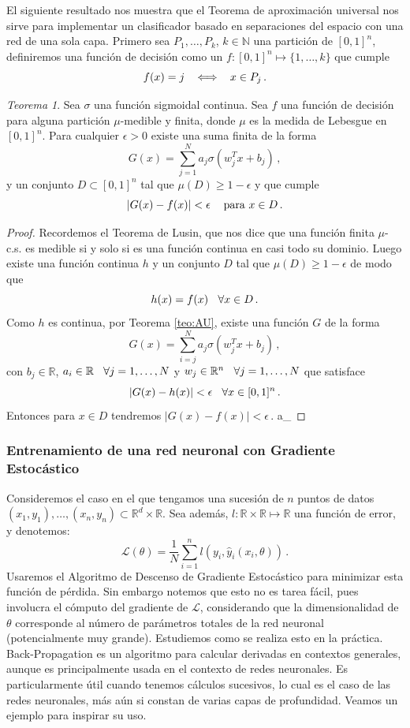 \documentclass[letterpaper,11pt]{article} %
\def\espacio{\hspace{.25cm}\,}
\theoremstyle{defbreak}
\theoremstyle{propbreak}
\theoremstyle{remark}
\theoremstyle{break}
\newtheorem{theorem}{Teorema}[subsection]
\def\ssi{\Longleftrightarrow}
\def\R{\mathbb{R}}
\def\N{\mathbb{N}}
\def\gris{\color{mygray}}
\def\negro{\color{black}}
\def\findem{\null\hfill\color{white}a\color{black}_\square}
\begin{document}
El siguiente resultado nos muestra que el Teorema de aproximación universal nos sirve para implementar un clasificador basado en separaciones del espacio con una red de una sola capa. Primero sea $P_1,\dots,P_k$, $k\in\N$ una partición de $[0,1]^n$, definiremos una función de decisión como un $f:[0,1]^n\mapsto \{1,\dots,k\}$ que cumple
$$ f(x) = j \espacio \ssi \espacio x\in P_j \,.$$
\begin{theorem}
Sea $\sigma$ una función sigmoidal continua. Sea $f$ una función de decisión para alguna partición $\mu$-medible y finita, donde $\mu$ es la medida de Lebesgue en $[0,1]^n$. Para cualquier $\epsilon>0$ existe una suma finita de la forma
$$ G(x) = \displaystyle \sum^N_{j=1}a_j\sigma(w^T_jx+b_j) \,,$$
y un conjunto $D\subset [0,1]^n$ tal que $\mu(D)\geq 1-\epsilon$ y que cumple
$$ |G(x)-f(x)|<\epsilon\espacio \text{ para }x\in D \,.$$
\end{theorem}
\begin{proof}
\gris
Recordemos el Teorema de Lusin, que nos dice que una función finita $\mu$-c.s. es medible si y solo si es una función continua en casi todo su dominio. Luego existe una función continua $h$ y un conjunto $D$ tal que $\mu(D)\geq 1-\epsilon$ de modo que 
$$ h(x)=f(x) \espacio \forall x \in D \,.$$
Como $h$ es continua, por Teorema \ref{teo:AU}, existe una función $G$ de la forma $$G(x)=\displaystyle \sum^N_{i=j}a_j\sigma(w^T_jx+b_j)\,,$$
con  $b_j\in\R$, $a_i\in\R\espacio \forall j=1,\dots,N$ y $w_j\in\R^n\espacio\forall j=1,\dots,N$ que satisface
$$ |G(x)-h(x)|<\epsilon \espacio \forall x\in [0,1]^n\,.$$
Entonces para $x\in D$ tendremos $|G(x)-f(x)|<\epsilon$\,. \findem
\negro
\end{proof}

\subsubsection{Entrenamiento de una red neuronal con Gradiente Estocástico}
Consideremos el caso en el que tengamos una sucesión de $n$ puntos de datos $(x_1,y_1),\dots,(x_n,y_n)\subset \R^d\times\R$. Sea además, $l:\R\times\R\mapsto\R$ una función de error, y denotemos:
$$ \mathcal{L}(\theta) = \displaystyle\frac{1}{N}\sum_{i=1}^n l(y_i,\hat y_i(x_i,\theta)) \,.$$ 
Usaremos el Algoritmo de Descenso de Gradiente Estocástico para minimizar esta función de pérdida. Sin embargo notemos que esto no es tarea fácil, pues involucra el cómputo del gradiente de $\mathcal{L}$, considerando que la dimensionalidad de $\theta$ corresponde al número de parámetros totales de la red neuronal (potencialmente muy grande). Estudiemos como se realiza esto en la práctica.
Back-Propagation es un algoritmo para calcular derivadas en contextos generales, aunque es principalmente usada en el contexto de redes neuronales. Es particularmente útil cuando tenemos cálculos sucesivos, lo cual es el caso de las redes neuronales, más aún si constan de varias capas de profundidad. Veamos un ejemplo para inspirar su uso.
\end{document}
